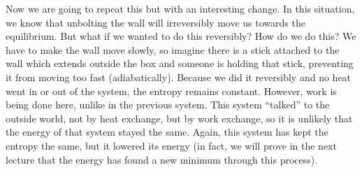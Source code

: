 \documentclass[a4paper,twoside,master.tex]{subfiles}
\begin{document}
Now we are going to repeat this but with an interesting change. In this situation, we know that unbolting the wall will irreversibly move us towards the equilibrium. But what if we wanted to do this reversibly? How do we do this? We have to make the wall move slowly, so imagine there is a stick attached to the wall which extends outside the box and someone is holding that stick, preventing it from moving too fast (adiabatically). Because we did it reversibly and no heat went in or out of the system, the entropy remains constant. However, work is being done here, unlike in the previous system. This system ``talked'' to the outside world, not by heat exchange, but by work exchange, so it is unlikely that the energy of that system stayed the same. Again, this system has kept the entropy the same, but it lowered its energy (in fact, we will prove in the next lecture that the energy has found a new minimum through this process).
\end{document}
